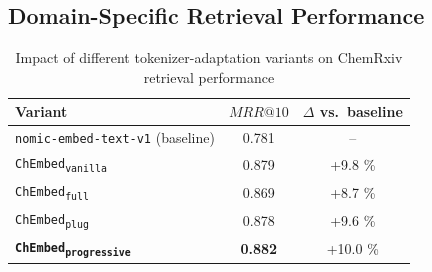 \subsection{Domain-Specific Retrieval Performance}
\begin{table}[!b]
    \centering
    \caption{Impact of different tokenizer-adaptation variants on ChemRxiv retrieval performance}
    \label{tab:tok-ablation}
    \begin{tabular}{lcc}
    \toprule
    \textbf{Variant} & $MRR@10$ & $\Delta$ vs.\ baseline \\
    \midrule
    \texttt{nomic-embed-text-v1} (baseline)       & 0.781 & --      \\
    \texttt{ChEmbed\textsubscript{vanilla}}       & 0.879 & +9.8 \% \\
    \texttt{ChEmbed\textsubscript{full}}          & 0.869 & +8.7 \% \\
    \texttt{ChEmbed\textsubscript{plug}}          & 0.878 & +9.6 \% \\
    \textbf{\texttt{ChEmbed\textsubscript{progressive}}} & \textbf{0.882} & +10.0 \% \\
    \bottomrule
    \end{tabular}
\end{table}